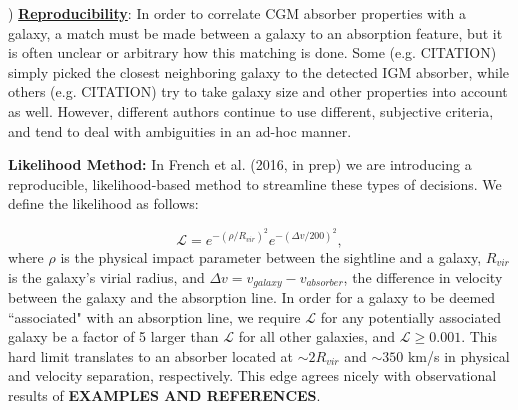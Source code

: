 \documentclass[12pt]{article}
\begin{document}
) \textbf{\underline{Reproducibility}}: In order to correlate CGM absorber properties with a galaxy, a match must be made between a galaxy to an absorption feature, but it is often unclear or arbitrary how this matching is done. Some (e.g. CITATION) simply picked the closest neighboring galaxy to the detected IGM absorber, while others (e.g. CITATION) try to take galaxy size and other properties into account as well. However, different authors continue to use different, subjective criteria, and tend to deal with ambiguities in an ad-hoc manner.

\textbf{Likelihood Method:} In French et al. (2016, in prep) we are introducing a reproducible, likelihood-based method to streamline these types of decisions. We define the likelihood as follows:

\begin{equation}
	\mathcal{L} = e^{-(\rho/R_{vir})^2} e^{-(\Delta v / 200)^2},
\end{equation}
where $\rho$ is the physical impact parameter between the sightline and a galaxy, $R_{vir}$ is the galaxy's virial radius, and $\Delta v = v_{galaxy} - v_{absorber}$, the difference in velocity between the galaxy and the absorption line. In order for a galaxy to be deemed ``associated" with an absorption line, we require $\mathcal{L}$ for any potentially associated galaxy be a factor of 5 larger than $\mathcal{L}$ for all other galaxies, and $\mathcal{L} \geq 0.001$. This hard limit translates to an absorber located at $\sim 2 R_{vir}$ and $\sim 350$ km/s in physical and velocity separation, respectively. This edge agrees nicely with observational results of \textbf{EXAMPLES AND REFERENCES}.\\
\end{document}
